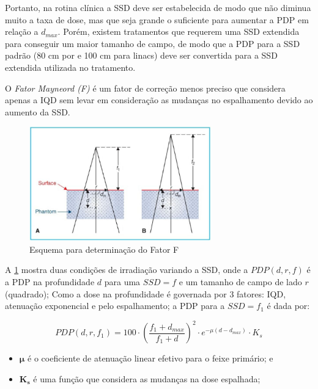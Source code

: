 \documentclass[11pt,a4paper]{article}
\newcounter{exemplo}
\begin{document}
	Portanto, na rotina clínica a SSD deve ser estabelecida de modo que não diminua muito a taxa de dose, mas que seja grande o suficiente para aumentar a PDP em relação a $d_{max}$. Porém, existem tratamentos que requerem uma SSD extendida para conseguir um maior tamanho de campo, de modo que a PDP para a SSD padrão (80 cm por  e 100 cm para linacs) deve ser convertida para a SSD extendida utilizada no tratamento. 

	O \textit{\textcolor{CarnationPink}{Fator Mayneord (F)}} é um fator de correção menos preciso que considera apenas a IQD sem levar em consideração as mudanças no espalhamento devido ao aumento da SSD.

	\begin{figure}[h]
		\centering
		\includegraphics[width=0.7\textwidth]{Imagens/fatorF.JPG}
		\caption{Esquema para determinação do Fator F}
		\label{fig:fatorF}
	\end{figure}
	
	A \ref{fig:fatorF} mostra duas condições de irradiação variando a SSD, onde a $PDP(d,r,f)$ é a PDP na profundidade $d$ para uma $SSD = f$ e um tamanho de campo de lado $r$ (quadrado); Como a dose na profundidade é governada por 3 fatores: IQD, atenuação exponencial e pelo espalhamento; a PDP  para a $SSD = f_1$ é dada por:
	
		\begin{equation}
			PDP(d, r, f_1) = 100 \cdot \left(\frac{f_1 + d_{max}}{f_1 + d}\right)^2 \cdot e^{-\mu (d - d_{max})} \cdot K_s
			\label{eq:pdpParaSSD1}
		\end{equation}
	
	\begin{exemplo}[onde:]
		\begin{itemize}
			\item \textcolor{CarnationPink}{$\mathbf{\mu}$} é o coeficiente de atenuação linear efetivo para o feixe primário; e
			\item \textcolor{CarnationPink}{$\mathbf{K_s}$} é uma função que considera as mudanças na dose espalhada;
		\end{itemize}
	\end{exemplo}
\end{document}
